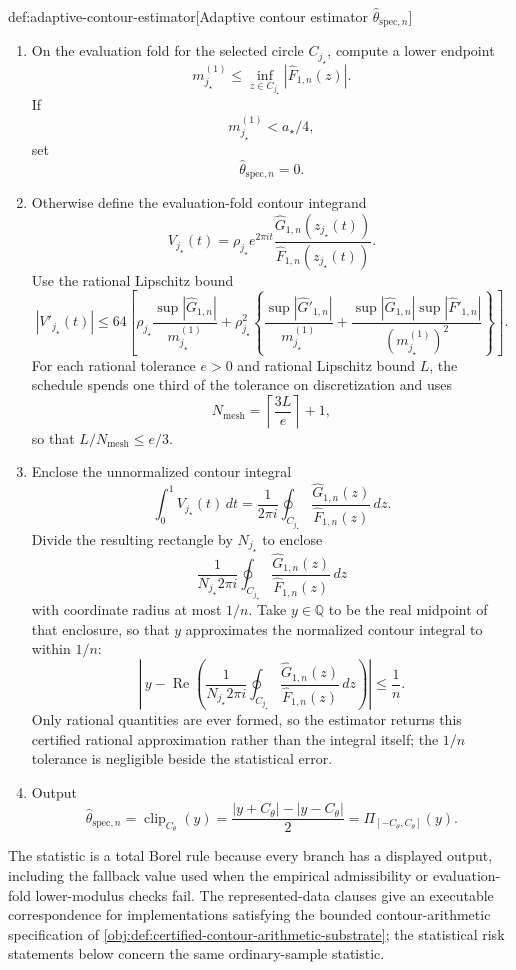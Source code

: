 \begin{algorithmv}{def:adaptive-contour-estimator}[Adaptive contour estimator \(\widehat\theta_{\mathrm{spec},n}\)]
\begin{enumerate}
\item On the evaluation fold for the selected circle \(C_{j_{\star}}\), compute a lower endpoint
\[
m_{j_{\star}}^{(1)}
\le
\inf_{z\in C_{j_{\star}}}|\widehat F_{1,n}(z)|.
\]
If
\[
m_{j_{\star}}^{(1)}<a_{\star}/4,
\]
set
\[
\widehat\theta_{\mathrm{spec},n}=0.
\]

\item Otherwise define the evaluation-fold contour integrand
\[
V_{j_{\star}}(t)=
\rho_{j_{\star}}e^{2\pi it}
\frac{\widehat G_{1,n}(z_{j_{\star}}(t))}
{\widehat F_{1,n}(z_{j_{\star}}(t))}.
\]
Use the rational Lipschitz bound
\[
|V'_{j_{\star}}(t)|\le
64\left[
\rho_{j_{\star}}\frac{\sup|\widehat G_{1,n}|}{m_{j_{\star}}^{(1)}}
+\rho_{j_{\star}}^2\left\{
\frac{\sup|\widehat G'_{1,n}|}{m_{j_{\star}}^{(1)}}
+\frac{\sup|\widehat G_{1,n}|\sup|\widehat F'_{1,n}|}{(m_{j_{\star}}^{(1)})^2}
\right\}\right].
\]
For each rational tolerance \(e>0\) and rational Lipschitz bound \(L\), the schedule spends one third of the tolerance on discretization and uses
\[
N_{\mathrm{mesh}}=\left\lceil\frac{3L}{e}\right\rceil+1,
\]
so that \(L/N_{\mathrm{mesh}}\le e/3\).

\item Enclose the unnormalized contour integral
\[
\int_0^1V_{j_{\star}}(t)\,dt
=
\frac{1}{2\pi i}\oint_{C_{j_{\star}}}
\frac{\widehat G_{1,n}(z)}
{\widehat F_{1,n}(z)}\,dz.
\]
Divide the resulting rectangle by \(N_{j_{\star}}\) to enclose
\[
\frac{1}{N_{j_{\star}}2\pi i}
\oint_{C_{j_{\star}}}
\frac{\widehat G_{1,n}(z)}
{\widehat F_{1,n}(z)}\,dz
\]
with coordinate radius at most \(1/n\). Take \(y\in\mathbb Q\) to be the real midpoint of that enclosure, so that \(y\) approximates the normalized contour integral to within \(1/n\):
\[
\left|\,y-\operatorname{Re}\left(\frac{1}{N_{j_{\star}}2\pi i}
\oint_{C_{j_{\star}}}\frac{\widehat G_{1,n}(z)}{\widehat F_{1,n}(z)}\,dz\right)\right|\le\frac1n.
\]
Only rational quantities are ever formed, so the estimator returns this certified rational approximation rather than the integral itself; the \(1/n\) tolerance is negligible beside the statistical error.

\item Output
\[
\widehat\theta_{\mathrm{spec},n}
=
\operatorname{clip}_{C_{\theta}}(y)
=
\frac{|y+C_{\theta}|-|y-C_{\theta}|}{2}
=
\Pi_{[-C_{\theta},C_{\theta}]}(y).
\]
\end{enumerate}
\end{algorithmv}

The statistic  is a total Borel rule because every branch has a displayed output, including the fallback value used when the empirical admissibility or evaluation-fold lower-modulus checks fail. The represented-data clauses give an executable correspondence for implementations satisfying the bounded contour-arithmetic specification of \cref{obj:def:certified-contour-arithmetic-substrate}; the statistical risk statements below concern the same ordinary-sample statistic.

